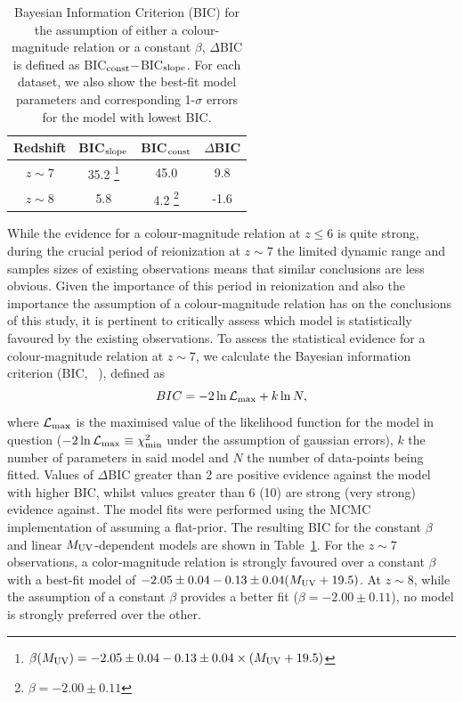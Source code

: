 \begin{table}
\begin{minipage}{\textwidth}
\centering
  \caption[Bayesian Information Criterion (BIC) for the assumption of either a colour-magnitude relation or a constant $\beta$.]{Bayesian Information Criterion (BIC) for the assumption of either a colour-magnitude relation or a constant $\beta$, $\Delta$BIC is defined as BIC$_{\rm{const}} -$BIC$_{\rm{slope}}$. For each dataset, we also show the best-fit model parameters and corresponding 1-$\sigma$ errors for the model with lowest BIC.}	
	\begin{tabular}{cccc}\label{tab:BIC_muv}
    	Redshift	& BIC$_{\rm{slope}}$ & BIC$_{\rm{const}}$ & $\Delta$BIC \\
    \hline
	$z\sim7$  & 35.2 \footnote[1]{\( \beta(M_{\rm{UV}}) = -2.05 \pm 0.04 - 0.13 \pm 0.04\times (M_{\rm{UV}} + 19.5)\)}  & 45.0 & 9.8 \\
	$z\sim8$ &  5.8  & 4.2 \footnote[2]{\( \beta = -2.00 \pm 0.11 \)} & -1.6 \\
  \end{tabular}
  \end{minipage}

\end{table}

While the evidence for a colour-magnitude relation at $z\leq6$ is quite strong, during the crucial period of reionization at $z\sim7$ the limited dynamic range and samples sizes of existing observations means that similar conclusions are less obvious. Given the importance of this period in reionization and also the importance the assumption of a colour-magnitude relation has on the conclusions of this study, it is pertinent to critically assess which model is statistically favoured by the existing observations. To assess the statistical evidence for a colour-magnitude relation at $z\sim7$, we calculate the Bayesian information criterion (BIC, \citeauthor{Schwarz:1978uv}~\citeyear{Schwarz:1978uv}), defined as
\begin{equation}
	BIC = 	-2 \ln\mathcal{L}_{\rm{max}} + k \ln N,
\end{equation}
where $\mathcal{L}_{\rm{max}}$ is the maximised value of the likelihood function for the model in question ($-2 \ln \mathcal{L}_{\rm{max}} \equiv \chi^{2}_{\rm{min}}$ under the assumption of gaussian errors), $k$ the number of parameters in said model and $N$ the number of data-points being fitted. Values of $\Delta$BIC greater than 2 are positive evidence against the model with higher BIC, whilst values greater than 6 (10) are strong (very strong) evidence against. The model fits were performed using the MCMC implementation of \citet{ForemanMackey:2013io} assuming a flat-prior. The resulting BIC for the constant $\beta$ and linear $M_{\rm{UV}}$-dependent models are shown in Table~\ref{tab:BIC_muv}. For the $z\sim7$ observations, a color-magnitude relation is strongly favoured over a constant $\beta$ with a best-fit model of \( -2.05\pm0.04 -0.13\pm0.04(M_{\rm{UV}} + 19.5)\). At $z\sim8$, while the assumption of a constant $\beta$ provides a better fit ($\beta = -2.00 \pm 0.11$), no model is strongly preferred over the other.

